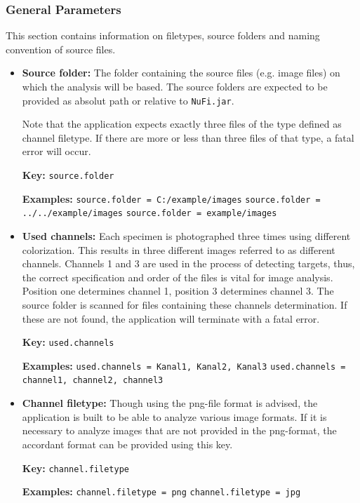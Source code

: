 \documentclass[a4paper, 11pt]{article}
\newcommand{\code}[1]{\colorbox{codegray}{\texttt{#1}}}
\begin{document}
\subsubsection{General Parameters}
This section contains information on filetypes, source folders and naming
convention of source files.
\begin{itemize}
  \item \textbf{Source folder:} The folder containing the source files (e.g.
  image files) on which the analysis will be based. The source folders are
  expected to be provided as absolut path or relative to \code{NuFi.jar}.
  
  Note that the application expects exactly three files of the type defined as
  channel filetype. If there are more or less than three files of that type, a
  fatal error will occur.
  
  \textbf{Key:}
  \newline \code{source.folder}
  
  \textbf{Examples:}
  \newline \code{source.folder = C:/example/images}
  \newline \code{source.folder = ../../example/images}
  \newline \code{source.folder = example/images}
  
  \item \textbf{Used channels:} Each specimen is photographed three times
  using different colorization. This results in three different images
  referred to as different channels. Channels 1 and 3 are used in the process
  of detecting targets, thus, the correct specification and order of the
  files is vital for image analysis. Position one determines channel 1,
  position 3 determines channel 3. The source folder is scanned for files
  containing these channels determination. If these are not found, the
  application will terminate with a fatal error.
  
  \textbf{Key:}
  \newline \code{used.channels}
  
  \textbf{Examples:}
  \newline \code{used.channels = Kanal1, Kanal2, Kanal3}
  \newline \code{used.channels = channel1, channel2, channel3}
  
  \item \textbf{Channel filetype:} Though using the png-file format is advised,
  the application is built to be able to analyze various image formats. If it
  is necessary to analyze images that are not provided in the png-format, the
  accordant format can be provided using this key.
  
  \textbf{Key:}
  \newline \code{channel.filetype}
  
  \textbf{Examples:}
  \newline \code{channel.filetype = png}
  \newline \code{channel.filetype = jpg}
\end{itemize}
\end{document}
